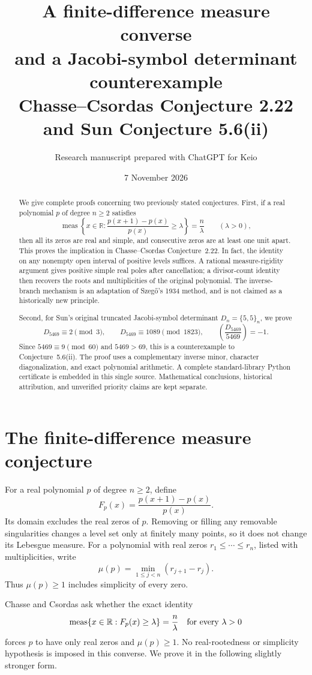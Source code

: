 \documentclass[11pt,a4paper]{article}
\title{\textbf{A finite-difference measure converse\\
and a Jacobi-symbol determinant\\counterexample}\\[7pt]
\large Chasse--Csordas Conjecture 2.22 and Sun Conjecture 5.6(ii)}
\author{Research manuscript prepared with ChatGPT for Keio}
\date{7 November 2026}
\theoremstyle{remark}
\newcommand{\jac}[2]{\left(\frac{#1}{#2}\right)}
\DeclareMathOperator{\meas}{meas}
\begin{document}
\maketitle
\begin{abstract}
We give complete proofs concerning two previously stated conjectures.
First, if a real polynomial $p$ of degree $n\ge2$ satisfies
\[
 \meas\left\{x\in\mathbb R:
 \frac{p(x+1)-p(x)}{p(x)}\ge\lambda\right\}=\frac n\lambda
 \qquad(\lambda>0),
\]
then all its zeros are real and simple, and consecutive zeros are at
least one unit apart. This proves the implication in Chasse--Csordas
Conjecture~2.22. In fact, the identity on any nonempty open interval of
positive levels suffices. A rational measure-rigidity argument gives
positive simple real poles after cancellation; a divisor-count identity
then recovers the roots and multiplicities of the original polynomial.
The inverse-branch mechanism is an adaptation of Szeg\H{o}'s 1934 method,
and is not claimed as a historically new principle.

Second, for Sun's original truncated Jacobi-symbol determinant
$D_n=\{5,5\}_n$, we prove
\[
 D_{5469}\equiv2\pmod3,\qquad
 D_{5469}\equiv1089\pmod{1823},\qquad
 \jac{D_{5469}}{5469}=-1.
\]
Since $5469\equiv9\pmod{60}$ and $5469>69$, this is a counterexample to
Conjecture~5.6(ii). The proof uses a complementary inverse minor,
character diagonalization, and exact polynomial arithmetic. A complete
standard-library Python certificate is embedded in this single source.
Mathematical conclusions, historical attribution, and unverified
priority claims are kept separate.
\end{abstract}

\section{The finite-difference measure conjecture}
\label{sec:cc-statement}

For a real polynomial $p$ of degree $n\ge2$, define
\[
 F_p(x)=\frac{p(x+1)-p(x)}{p(x)}.
\]
Its domain excludes the real zeros of $p$. Removing or filling any
removable singularities changes a level set only at finitely many points,
so it does not change its Lebesgue measure.
For a polynomial with real zeros
$r_1\le\cdots\le r_n$, listed with multiplicities, write
\[
 \mu(p)=\min_{1\le j<n}(r_{j+1}-r_j).
\]
Thus $\mu(p)\ge1$ includes simplicity of every zero.

Chasse and Csordas \cite[Conjecture~2.22, p.~88]{ChasseCsordas2012}
ask whether the exact identity
\begin{equation}\label{eq:cc-original}
 \meas\{x\in\mathbb R:F_p(x)\ge\lambda\}=\frac n\lambda
 \quad\hbox{for every }\lambda>0
\end{equation}
forces $p$ to have only real zeros and $\mu(p)\ge1$.
No real-rootedness or simplicity hypothesis is imposed in this converse.
We prove it in the following slightly stronger form.
\end{document}
